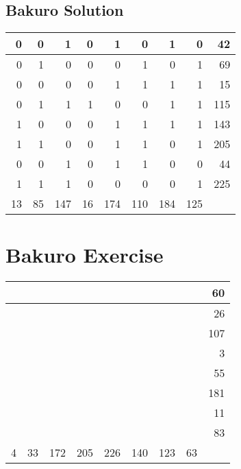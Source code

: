\documentclass[]{article}
\begin{document}
 \subsection{Bakuro Solution} 
\begin{tabular}{rrrrrrrrr}
\hline
  0 &  0 &   1 &  0 &   1 &   0 &   1 &   0 &  42 \\ \hline
  0 &  1 &   0 &  0 &   0 &   1 &   0 &   1 &  69 \\ \hline
  0 &  0 &   0 &  0 &   1 &   1 &   1 &   1 &  15 \\ \hline
  0 &  1 &   1 &  1 &   0 &   0 &   1 &   1 & 115 \\ \hline
  1 &  0 &   0 &  0 &   1 &   1 &   1 &   1 & 143 \\ \hline
  1 &  1 &   0 &  0 &   1 &   1 &   0 &   1 & 205 \\ \hline
  0 &  0 &   1 &  0 &   1 &   1 &   0 &   0 &  44 \\ \hline
  1 &  1 &   1 &  0 &   0 &   0 &   0 &   1 & 225 \\ \hline
 13 & 85 & 147 & 16 & 174 & 110 & 184 & 125 &     \\ \hline
\hline
\end{tabular}\newpage\section{Bakuro Exercise}\begin{tabular}{rrrrrrrrr}
\hline
   &    &     &     &     &     &     &    &  60 \\ \hline
   &    &     &     &     &     &     &    &  26 \\ \hline
   &    &     &     &     &     &     &    & 107 \\ \hline
   &    &     &     &     &     &     &    &   3 \\ \hline
   &    &     &     &     &     &     &    &  55 \\ \hline
   &    &     &     &     &     &     &    & 181 \\ \hline
   &    &     &     &     &     &     &    &  11 \\ \hline
   &    &     &     &     &     &     &    &  83 \\ \hline
 4 & 33 & 172 & 205 & 226 & 140 & 123 & 63 &     \\ \hline
\hline
\end{tabular}\newpage 
\end{document}
